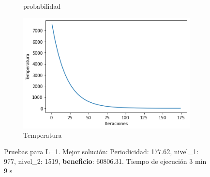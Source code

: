 \documentclass[a4paper,12pt]{article}
\begin{document}
\begin{figure}[H]
\begin{subfigure}{0.24\textwidth}
			\caption{probabilidad}
		\end{subfigure}
		\hfill
		\begin{subfigure}{0.24\textwidth}
			\centering
			\includegraphics[width=\textwidth]{include/L1/temperatura.png}
			\caption{Temperatura}
		\end{subfigure}
		\caption{Pruebas para L=1. Mejor solución: Periodicidad: 177.62, nivel\_1: 977, nivel\_2: 1519, \textbf{beneficio}: 60806.31. Tiempo de ejecución 3 min 9 s }
	\end{figure}
\end{document}
